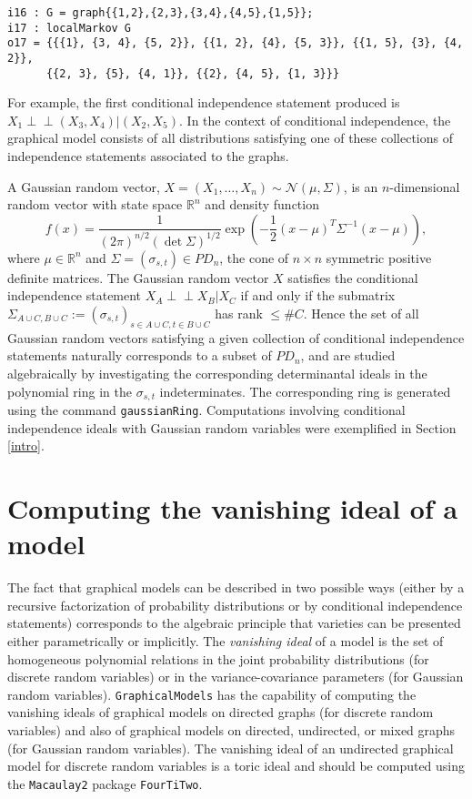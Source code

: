 \documentclass[letterpaper]{article}
\theoremstyle{definition}
\def\ci{\perp\!\!\!\perp}
\begin{document}
\begin{verbatim}
i16 : G = graph{{1,2},{2,3},{3,4},{4,5},{1,5}};
i17 : localMarkov G
o17 = {{{1}, {3, 4}, {5, 2}}, {{1, 2}, {4}, {5, 3}}, {{1, 5}, {3}, {4, 2}}, 
      {{2, 3}, {5}, {4, 1}}, {{2}, {4, 5}, {1, 3}}}
\end{verbatim}

For example, the first conditional independence statement produced
is $X_{1} \ci (X_{3}, X_{4}) | (X_{2}, X_{5})$.  In the 
context of conditional independence, the graphical model
consists of all distributions satisfying one of these collections
of independence statements associated to the graphs.

A Gaussian random vector, $X = (X_{1}, \ldots, X_{n}) 
\sim \mathcal{N}(\mu, \Sigma)$, is an
$n$-dimensional random vector with state space $\mathbb{R}^{n}$ and
density function
$$
f(x)  =  \frac{1}{(2 \pi)^{n/2}(\det \Sigma)^{1/2} } 
\exp\left( - \frac{1}{2} (x- \mu)^{T} \Sigma^{{-1}} (x - \mu) \right), 
$$
where $\mu \in \mathbb{R}^{n}$ and $\Sigma = (\sigma_{s,t}) \in PD_{n}$, the cone of 
$n \!\times\! n$ symmetric positive definite matrices.  The Gaussian random vector
$X$ satisfies the conditional independence statement $X_{A} \ci X_{B} | X_{C}$
if and only if the submatrix 
$\Sigma_{A \cup C, B \cup C}  := 
(\sigma_{s,t})_{s \in A \cup C, t \in B \cup C}$ has rank $\leq \#C$.
Hence the set of all Gaussian random vectors satisfying a given
collection of conditional independence statements naturally corresponds
to a subset of $PD_{n}$, and are studied algebraically by investigating  the 
corresponding determinantal ideals in the polynomial ring
in the $\sigma_{s,t}$ indeterminates.  The corresponding ring
is generated using the command {\tt gaussianRing}.
Computations involving conditional independence ideals with
Gaussian random variables were exemplified in Section \ref{intro}. 



\section{Computing the vanishing ideal of a model}

The fact that graphical models can be described in two possible ways (either by a recursive
factorization of probability distributions or by conditional independence
statements) corresponds to the algebraic principle that varieties can be presented either
parametrically or implicitly. The \emph{vanishing ideal} of a model is the set
of homogeneous polynomial relations in the joint probability distributions (for discrete
random variables) or in the variance-covariance parameters (for Gaussian
random variables).
{\tt GraphicalModels} has the capability of computing the vanishing ideals
of graphical models on directed graphs (for discrete random variables) and also
of graphical models on directed, undirected, or  mixed
graphs (for Gaussian random variables).  The vanishing ideal
of an undirected graphical model for discrete random variables is
a toric ideal and
should be computed using the {\tt Macaulay2} package {\tt FourTiTwo}.
\end{document}
